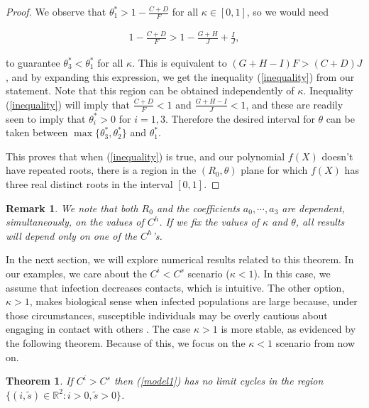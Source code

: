 \documentclass[sn-basic]{sn-jnl}%
\theoremstyle{thmstyleone}%
\newtheorem{theorem}{Theorem}%
\theoremstyle{thmstyletwo}%
\newtheorem{remark}{Remark}%
\theoremstyle{thmstylethree}%
\newcommand{\bR}{{\mathbb{R}}}      %
\newcommand{\ws}{\widetilde{s}}
\begin{document}
\begin{proof}
We observe that $\theta_1^* > 1- \frac{C+D}{F}$ for all $\kappa \in [0,1]$, so we would need

\begin{align*}
    1- \frac{C+D}{F} > 1 - \frac{G+H}{J} + \frac{I}{J},
\end{align*}

to guarantee $\theta_3^* < \theta_1^*$ for all $\kappa$. This is equivalent to $(G+H-I)F > (C+D)J$, and by expanding this expression, we get the inequality (\ref{inequality}) from our statement. Note that this region can be obtained independently of $\kappa$. Inequality (\ref{inequality}) will imply that $\frac{C+D}{F}<1$ and $\frac{G+H-I}{J}<1$, and these are readily seen to imply that $\theta_i^*>0$ for $i=1,3$. Therefore the desired interval for $\theta$ can be taken between $\max\{\theta_3^*,\theta_2^*\}$ and $\theta_1^*$.

This proves that when (\ref{inequality}) is true, and our polynomial $f(X)$ doesn't have repeated roots, there is a region in the $(R_0,\theta)$ plane for which $f(X)$ has three real distinct roots in the interval $[0,1]$. 
\end{proof}

\begin{remark}
We note that both $R_0$ and the coefficients $a_0,\cdots,a_3$ are dependent, simultaneously, on the values of $C^h$. If we fix the values of $\kappa$ and $\theta$, all results will depend only on one of the $C^h$'s.
\end{remark}

In the next section, we will explore numerical results related to this theorem. In our examples, we care about the $C^i<C^s$ scenario ($\kappa<1$). In this case, we assume that infection decreases contacts, which is intuitive. The other option, $\kappa>1$, makes biological sense when infected populations are large because, under those circumstances, susceptible individuals may be overly cautious about engaging in contact with others \cite{CCast13}. The case $\kappa>1$ is more stable, as evidenced by the following theorem. Because of this, we focus on the $\kappa<1$ scenario from now on.

\begin{theorem}\label{nocycles}
    If $C^i>C^s$ then (\ref{model1}) has no limit cycles in the region $\{(i,\ws) \in \bR^2: i>0, \ws>0\}$.
\end{theorem}
\end{document}
